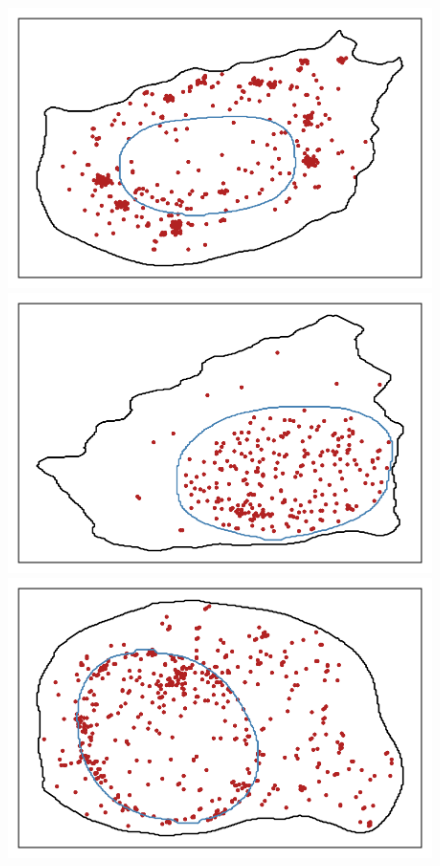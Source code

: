 \begin{figure}[h]
	\centering
		\includegraphics[trim={0.5cm 0.5cm 0.5cm 0.5cm},clip,width=\linewidth]{figures/chapter5/plot_foci}
	\endminipage\hfill
		\includegraphics[trim={0.5cm 0.5cm 0.5cm 0.5cm},clip,width=\linewidth]{figures/chapter5/plot_intranuclear}
	\endminipage\hfill
		\includegraphics[trim={0.5cm 0.5cm 0.5cm 0.5cm},clip,width=\linewidth]{figures/chapter5/plot_nuclear}

\end{figure}
